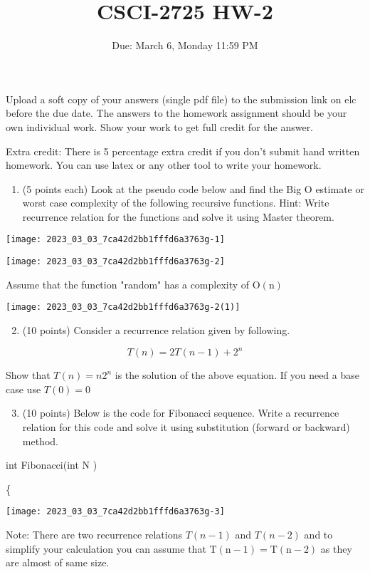 \documentclass[10pt]{article}
\title{CSCI-2725 HW-2 }
\author{Due: March 6, Monday 11:59 PM}
\date{}
\begin{document}
\maketitle
Upload a soft copy of your answers (single pdf file) to the submission link on elc before the due date. The answers to the homework assignment should be your own individual work. Show your work to get full credit for the answer.

Extra credit: There is 5 percentage extra credit if you don't submit hand written homework. You can use latex or any other tool to write your homework.

\begin{enumerate}
  \item (5 points each) Look at the pseudo code below and find the Big $\mathrm{O}$ estimate or worst case complexity of the following recursive functions. Hint: Write recurrence relation for the functions and solve it using Master theorem.
\end{enumerate}

\begin{center}
\texttt{[image: 2023\_03\_03\_7ca42d2bb1fffd6a3763g-1]}
\end{center}

\begin{center}
\texttt{[image: 2023\_03\_03\_7ca42d2bb1fffd6a3763g-2]}
\end{center}

Assume that the function "random" has a complexity of $\mathrm{O}(\mathrm{n})$

\begin{center}
\texttt{[image: 2023\_03\_03\_7ca42d2bb1fffd6a3763g-2(1)]}
\end{center}

\begin{enumerate}
  \setcounter{enumi}{1}
  \item (10 points) Consider a recurrence relation given by following.
\end{enumerate}

$$
T(n)=2 T(n-1)+2^{n}
$$

Show that $T(n)=n 2^{n}$ is the solution of the above equation. If you need a base case use $T(0)=0$

\begin{enumerate}
  \setcounter{enumi}{2}
  \item (10 points) Below is the code for Fibonacci sequence. Write a recurrence relation for this code and solve it using substitution (forward or backward) method.
\end{enumerate}

int Fibonacci(int $\mathrm{N}$ )

\{

\begin{center}
\texttt{[image: 2023\_03\_03\_7ca42d2bb1fffd6a3763g-3]}
\end{center}

Note: There are two recurrence relations $T(n-1)$ and $T(n-2)$ and to simplify your calculation you can assume that $\mathrm{T}(\mathrm{n}-1)=\mathrm{T}(\mathrm{n}-2)$ as they are almost of same size.
\end{document}
